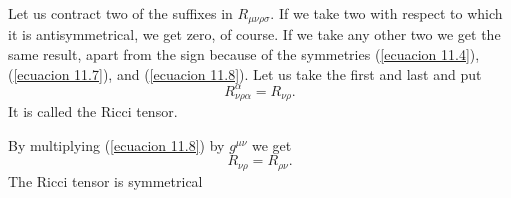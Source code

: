 Let us contract two of the suffixes in $R_{\mu\nu\rho\sigma}$. If we take two with respect to which it is 
antisymmetrical, we get zero, of course. If we take any other two we get the same result, apart from the sign because 
of the symmetries (\ref{ecuacion 11.4}), (\ref{ecuacion 11.7}), and (\ref{ecuacion 11.8}). Let us take the first and 
last and put
\[
R^{\alpha}_{\nu\rho\alpha} = R_{\nu\rho}.
\]
It is called the Ricci tensor.

By multiplying (\ref{ecuacion 11.8}) by $g^{\mu\nu}$ we get 
\begin{equation}
 \label{ecuacion 14.1}
 R_{\nu\rho} = R_{\rho\nu}.
\end{equation}
The Ricci tensor is symmetrical 

